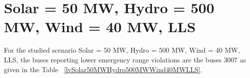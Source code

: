 \documentclass[10pt]{report}
\begin{document}
\section{Solar = 50 MW, Hydro = 500 MW, Wind = 40 MW, LLS}
For the studied scenario Solar = 50 MW, Hydro = 500 MW, Wind = 40 MW, LLS, the buses reporting lower emergency range violations are the buses 3007 as given in the Table ~\ref{lvSolar50MWHydro500MWWind40MWLLS}.
\begin{table}[H]
\caption{Contingencies reporting bus voltages lower than emergency voltage of 1.1 PU for scenario Solar = 50 MW, Hydro = 500 MW, Wind = 40 MW, LLS}
\label{lvSolar50MWHydro500MWWind40MWLLS}
\centering
{}
\end{table}
\end{document}

